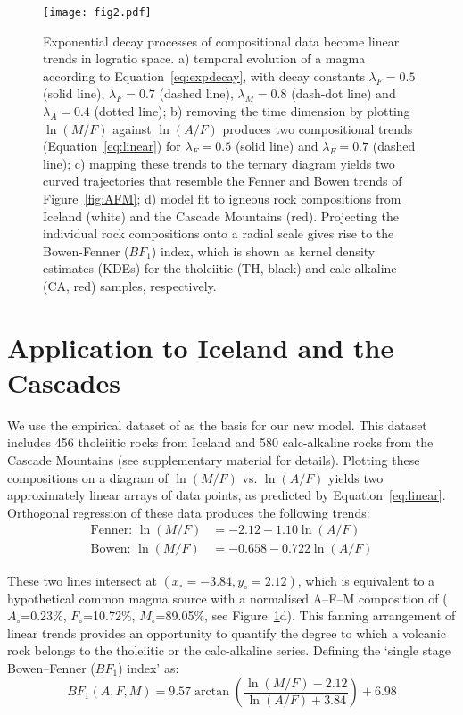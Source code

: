\documentclass{article}
\begin{document}
\begin{figure}[!ht]
  \centering
  \texttt{[image: fig2.pdf]}
  \caption{ Exponential decay processes of compositional data become
    linear trends in logratio space. a) temporal evolution of a magma
    according to Equation~\ref{eq:expdecay}, with decay constants
    $\lambda_{F}=0.5$ (solid line), $\lambda_{F}=0.7$ (dashed line),
    $\lambda_{M}=0.8$ (dash-dot line) and $\lambda_{A}=0.4$ (dotted
    line); b) removing the time dimension by plotting $\ln(M/F)$
    against $\ln(A/F)$ produces two compositional trends
    (Equation~\ref{eq:linear}) for $\lambda_{F}=0.5$ (solid line) and
    $\lambda_{F}=0.7$ (dashed line); c) mapping these trends to the
    ternary diagram yields two curved trajectories that resemble the
    Fenner and Bowen trends of Figure~\ref{fig:AFM}; d) model fit to
    igneous rock compositions from Iceland (white) and the Cascade
    Mountains (red). Projecting the individual rock compositions onto
    a radial scale gives rise to the Bowen-Fenner ($BF_1$) index,
    which is shown as kernel density estimates (KDEs) for the
    tholeiitic (TH, black) and calc-alkaline (CA, red) samples,
    respectively.}
  \label{fig:single-stage}
\end{figure}

\section{Application to Iceland and the Cascades}

We use the empirical dataset of \citet{rollinson2021} as the basis for
our new model. This dataset includes 456 tholeiitic rocks from Iceland
and 580 calc-alkaline rocks from the Cascade Mountains (see
supplementary material for details). Plotting these compositions on a
diagram of $\ln(M/F)$ vs. $\ln(A/F)$ yields two approximately linear
arrays of data points, as predicted by Equation~\ref{eq:linear}.
Orthogonal regression of these data produces the following trends:
\begin{equation}
  \begin{split}
    \mbox{Fenner:~} \ln(M/F) & = -2.12 - 1.10 \ln(A/F) \\
    \mbox{Bowen:~} \ln(M/F) & = -0.658 - 0.722 \ln(A/F)
  \end{split}
  \label{eq:1stagefit}
\end{equation}

These two lines intersect at $(x_\circ=-3.84, y_\circ=2.12)$, which is
equivalent to a hypothetical common magma source with a normalised
A--F--M composition of ($A_\circ$=0.23\%, $F_\circ$=10.72\%,
$M_\circ$=89.05\%, see Figure~\ref{fig:single-stage}d). This fanning
arrangement of linear trends provides an opportunity to quantify the
degree to which a volcanic rock belongs to the tholeiitic or the
calc-alkaline series. Defining the `single stage Bowen--Fenner
($BF_1$) index' as:
\begin{equation}
  BF_1(A,F,M) =
  9.57 
    \arctan\!\left(
  \frac{
    \ln\!\left({M}/{F}\right)-2.12
  }{
    \ln\!\left({A}/{F}\right)+3.84
  }
  \right) + 6.98
\end{equation}
\end{document}
